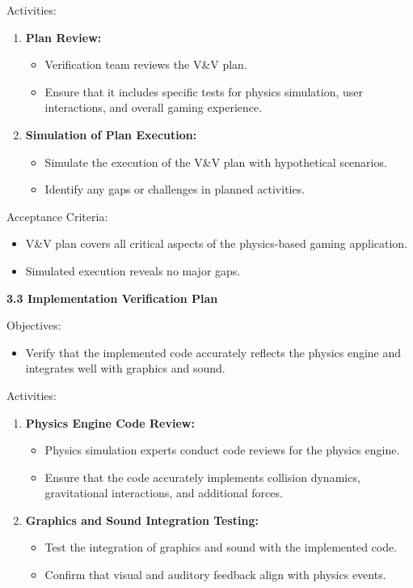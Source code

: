 \documentclass[
]{article}
\begin{document}
Activities:

\begin{enumerate}
\def\labelenumi{\arabic{enumi}.}
\item
  \textbf{Plan Review:}

  \begin{itemize}
  \item
    Verification team reviews the V\&V plan.
  \item
    Ensure that it includes specific tests for physics simulation, user
    interactions, and overall gaming experience.
  \end{itemize}
\item
  \textbf{Simulation of Plan Execution:}

  \begin{itemize}
  \item
    Simulate the execution of the V\&V plan with hypothetical scenarios.
  \item
    Identify any gaps or challenges in planned activities.
  \end{itemize}
\end{enumerate}

Acceptance Criteria:

\begin{itemize}
\item
  V\&V plan covers all critical aspects of the physics-based gaming
  application.
\item
  Simulated execution reveals no major gaps.
\end{itemize}

\textbf{3.3 Implementation Verification Plan}

Objectives:

\begin{itemize}
\item
  Verify that the implemented code accurately reflects the physics
  engine and integrates well with graphics and sound.
\end{itemize}

Activities:

\begin{enumerate}
\def\labelenumi{\arabic{enumi}.}
\item
  \textbf{Physics Engine Code Review:}

  \begin{itemize}
  \item
    Physics simulation experts conduct code reviews for the physics
    engine.
  \item
    Ensure that the code accurately implements collision dynamics,
    gravitational interactions, and additional forces.
  \end{itemize}
\item
  \textbf{Graphics and Sound Integration Testing:}

  \begin{itemize}
  \item
    Test the integration of graphics and sound with the implemented
    code.
  \item
    Confirm that visual and auditory feedback align with physics events.
  \end{itemize}
\end{enumerate}
\end{document}
